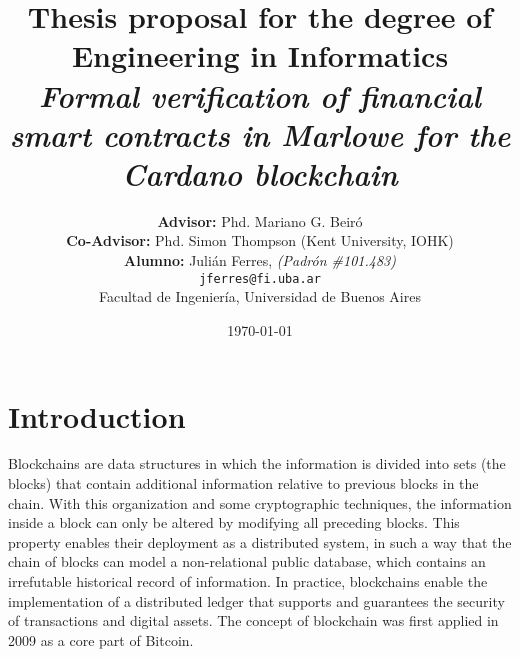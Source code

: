 \documentclass[12pt]{book}
\begin{document}
\begin{titlepage}

\title{     \textbf{Thesis proposal for the degree of \\Engineering in Informatics}\\[2.5ex]
\textit{Formal verification of financial smart contracts in Marlowe for the Cardano blockchain}}

\author{
             \textbf{Advisor:} Phd. Mariano G. Beiró \\[2.5ex]
             \textbf{Co-Advisor:} Phd. Simon Thompson (Kent University, IOHK) \\[2.5ex]
             \textbf{Alumno:} Julián Ferres, \textit{(Padrón \#101.483)}                                \\
                    \texttt{ jferres@fi.uba.ar }                                    \\[2.5ex]
            \normalsize{Facultad de Ingeniería, Universidad de Buenos Aires}        \\
       }
\date{\today}

\end{titlepage}

\maketitle
\thispagestyle{empty}

\maketitle

{
  \hypersetup{linkcolor=black}
  \tableofcontents
}

\section{Introduction}
Blockchains are data structures in which the information is divided into sets (the blocks) that contain additional information relative to previous blocks in the chain. With this organization and some cryptographic techniques, the information inside a block can only be altered by modifying all preceding blocks. This property enables their deployment as a distributed system, in such a way that the chain of blocks can model a non-relational public database, which contains an irrefutable historical record of information. 
In practice, blockchains enable the implementation of a distributed ledger that supports and guarantees the security of transactions and digital assets. The concept of blockchain was first applied in 2009 as a core part of Bitcoin.
\end{document}
